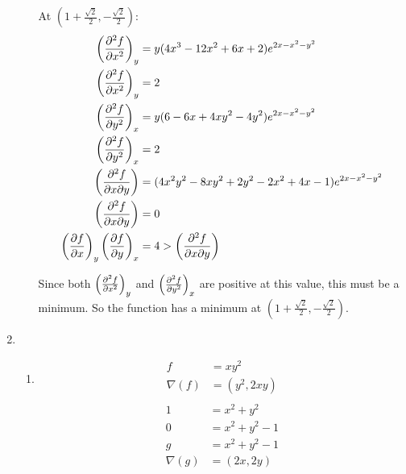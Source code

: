 \documentclass[10pt,\jkfside,a4paper]{article}
\begin{document}
\begin{enumerate}
\begin{enumerate}
At $(1 + \frac{\sqrt{2}}{2}, -\frac{\sqrt{2}}{2})$:
\begin{equation}
\begin{split}
\left(\pdv[2]{f}{x}\right)_y &= y(4x^3 - 12x^{2} + 6x + 2)e^{2x - x^{2} - y^{2}} \\
\left(\pdv[2]{f}{x}\right)_y &= 2 \\
\left(\pdv[2]{f}{y}\right)_x &= y(6 - 6x + 4xy^{2} - 4y^{2})e^{2x - x^{2} - y^{2}} \\
\left(\pdv[2]{f}{y}\right)_x &= 2 \\
\left(\pdv[2]{f}{x}{y}\right) &= (4x^{2}y^{2} - 8xy^{2} + 2y^{2} - 2x^{2} + 4x - 1)e^{2x - x^{2} - y^{2}}\\
\left(\pdv[2]{f}{x}{y}\right) &= 0 \\
\left(\pdv{f}{x}\right)_y \left(\pdv{f}{y}\right)_x &= 4 > \left(\pdv[2]{f}{x}{y}\right) \\
\end{split}
\end{equation}

Since both $\left(\pdv[2]{f}{x}\right)_y$ and $\left(\pdv[2]{f}{y}\right)_x$ are positive 
at this value, this must be a minimum. So the function has a minimum at $(1 + \frac{\sqrt{2}}{2}, -\frac{\sqrt{2}}{2})$.

\end{enumerate}

\item 
\begin{enumerate}

\item 
\begin{equation}
\begin{split}
f &= xy^{2} \\
\nabla(f) &= (y^{2}, 2xy) \\
\end{split}
\end{equation}
\begin{equation}
\begin{split}
1 &= x^{2} + y^{2} \\
0 &= x^{2} + y^{2} - 1 \\
g &= x^{2} + y^{2} - 1 \\
\nabla(g) &= (2x, 2y) \\
\end{split}
\end{equation}


\end{enumerate}
\end{enumerate}
\end{document}
